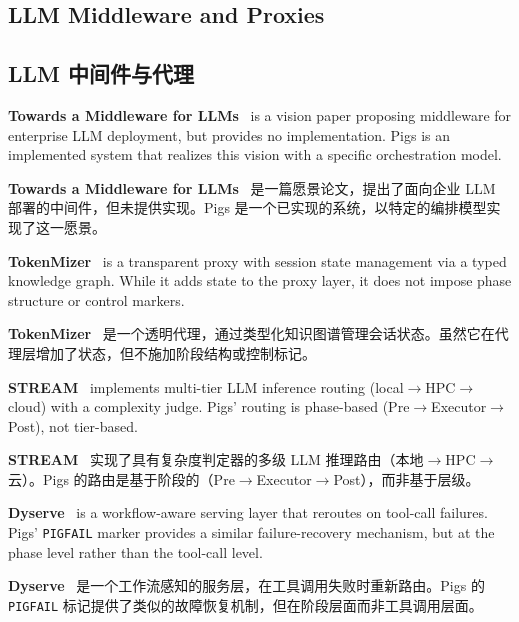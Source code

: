 \subsection{LLM Middleware and Proxies}
\begin{chinese}
\subsection{LLM 中间件与代理}
\end{chinese}

\textbf{Towards a Middleware for LLMs}~\citep{dzanic2024middleware} is a vision paper proposing middleware for enterprise LLM deployment, but provides no implementation. Pigs is an implemented system that realizes this vision with a specific orchestration model.
\begin{chinese}
\textbf{Towards a Middleware for LLMs}~\citep{dzanic2024middleware} 是一篇愿景论文，提出了面向企业 LLM 部署的中间件，但未提供实现。Pigs 是一个已实现的系统，以特定的编排模型实现了这一愿景。
\end{chinese}

\textbf{TokenMizer}~\citep{liu2026tokenmizer} is a transparent proxy with session state management via a typed knowledge graph. While it adds state to the proxy layer, it does not impose phase structure or control markers.
\begin{chinese}
\textbf{TokenMizer}~\citep{liu2026tokenmizer} 是一个透明代理，通过类型化知识图谱管理会话状态。虽然它在代理层增加了状态，但不施加阶段结构或控制标记。
\end{chinese}

\textbf{STREAM}~\citep{stream2026} implements multi-tier LLM inference routing (local$\rightarrow$HPC$\rightarrow$cloud) with a complexity judge. Pigs' routing is phase-based (Pre$\rightarrow$Executor$\rightarrow$Post), not tier-based.
\begin{chinese}
\textbf{STREAM}~\citep{stream2026} 实现了具有复杂度判定器的多级 LLM 推理路由（本地$\rightarrow$HPC$\rightarrow$云）。Pigs 的路由是基于阶段的（Pre$\rightarrow$Executor$\rightarrow$Post），而非基于层级。
\end{chinese}

\textbf{Dyserve}~\citep{dyserve2027} is a workflow-aware serving layer that reroutes on tool-call failures. Pigs' \texttt{PIGFAIL} marker provides a similar failure-recovery mechanism, but at the phase level rather than the tool-call level.
\begin{chinese}
\textbf{Dyserve}~\citep{dyserve2027} 是一个工作流感知的服务层，在工具调用失败时重新路由。Pigs 的 \texttt{PIGFAIL} 标记提供了类似的故障恢复机制，但在阶段层面而非工具调用层面。
\end{chinese}

